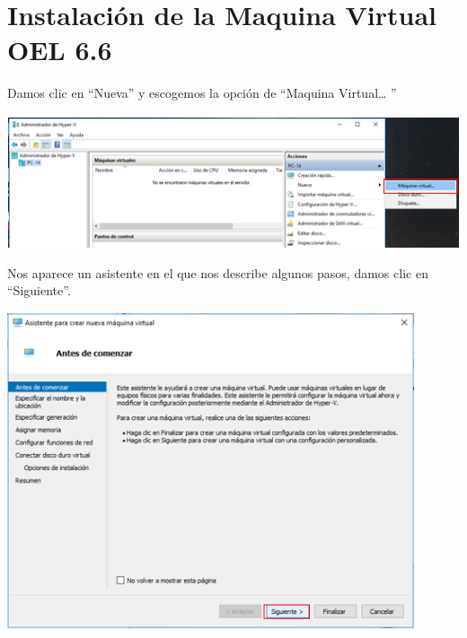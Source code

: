 \section{Instalación de la Maquina Virtual OEL 6.6} 
\vspace{\baselineskip}
Damos clic en “Nueva” y escogemos la opción de “Maquina Virtual… ” 
	\begin{center}
	\includegraphics[width=14cm]{./Imagenes/14} 
	\end{center} 

\vspace{\baselineskip}

Nos aparece un asistente en el que nos describe algunos pasos, damos clic en “Siguiente”. 
	\begin{center}
		\includegraphics[width=12cm]{./Imagenes/15} 
	\end{center} 

\newpage

